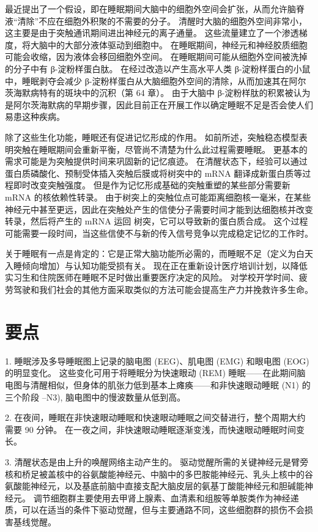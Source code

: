最近提出了一个假设，即在睡眠期间大脑中的细胞外空间会扩张，从而允许脑脊液“清除”不应在细胞外积聚的不需要的分子。 清醒时大脑的细胞外空间非常小，这主要是由于突触通讯期间进出神经元的离子通量。 这些流量建立了一个渗透梯度，将大脑中的大部分液体驱动到细胞中。 在睡眠期间，神经元和神经胶质细胞可能会收缩，因为液体会移回细胞外空间。 在睡眠期间可能从细胞外空间被洗掉的分子中有 β-淀粉样蛋白肽。 在经过改造以产生高水平人类 β-淀粉样蛋白的小鼠中，睡眠剥夺会减少 β-淀粉样蛋白从大脑细胞外空间的清除，从而加速其在阿尔茨海默病特有的斑块中的沉积（第 64 章）。 由于大脑中 β-淀粉样肽的积累被认为是阿尔茨海默病的早期步骤，因此目前正在开展工作以确定睡眠不足是否会使人们易患这种疾病。

除了这些生化功能，睡眠还有促进记忆形成的作用。 如前所述，突触稳态模型表明突触在睡眠期间会重新平衡，尽管尚不清楚为什么此过程需要睡眠。 更基本的需求可能是为突触提供时间来巩固新的记忆痕迹。 在清醒状态下，经验可以通过蛋白质磷酸化、预制受体插入突触后膜或将树突中的 mRNA 翻译成新蛋白质等过程即时改变突触强度。 但是作为记忆形成基础的突触重塑的某些部分需要新 mRNA 的核依赖性转录。 由于树突上的突触位点可能距离细胞核一毫米，在某些神经元中甚至更远，因此在突触处产生的信使分子需要时间才能到达细胞核并改变转录，然后将产生的 mRNA 运回 树突，它可以导致新的蛋白质合成。 这个过程可能需要一段时间，当这些信使不与新的传入信号竞争以完成稳定记忆的工作时。

关于睡眠有一点是肯定的：它是正常大脑功能所必需的，而睡眠不足（定义为白天入睡倾向增加）与认知功能受损有关。 现在正在重新设计医疗培训计划，以降低实习生和住院医师在睡眠不足时做出重要医疗决定的风险。 对学校开学时间、疲劳驾驶和我们社会的其他方面采取类似的方法可能会提高生产力并挽救许多生命。

\section{要点}

1. 睡眠涉及多导睡眠图上记录的脑电图 (EEG)、肌电图 (EMG) 和眼电图 (EOG) 的明显变化。 这些变化可用于将睡眠分为快速眼动 (REM) 睡眠——在此期间脑电图与清醒相似，但身体的肌张力低到基本上瘫痪——和非快速眼动睡眠 (N1) 的三个阶段 –N3), 脑电图中的慢波数量从低到高。 

2. 在夜间，睡眠在非快速眼动睡眠和快速眼动睡眠之间交替进行，整个周期大约需要 90 分钟。 在一夜之间，非快速眼动睡眠逐渐变浅，而快速眼动睡眠时间变长。 

3. 清醒状态是由上升的唤醒网络主动产生的。 驱动觉醒所需的关键神经元是臂旁核和桥足被盖核中的谷氨酸能神经元、中脑中的多巴胺能神经元、乳头上核中的谷氨酸能神经元，以及基底前脑中直接支配大脑皮层的氨基丁酸能神经元和胆碱能神经元。 调节细胞群主要使用去甲肾上腺素、血清素和组胺等单胺类作为神经递质，可以在适当的条件下驱动觉醒，但与主要通路不同，这些细胞群的损伤不会损害基线觉醒。 


